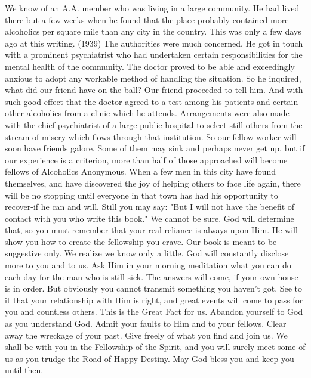 \begin{biblechapter}
We know of an A.A. member who was living in a large community.  He had lived there but a few weeks when he found that the place probably contained more alcoholics per square mile than any city in the country.  This was only a few days ago at this writing.  (1939)  The authorities were much concerned.  He got in touch with a prominent psychiatrist who had undertaken certain responsibilities for the mental health of the community.  The doctor proved to be able and exceedingly anxious to adopt any workable method of handling the situation.  So he inquired, what did our friend have on the ball?
Our friend proceeded to tell him.  And with such good effect that the doctor agreed to a test among his patients and certain other alcoholics from a clinic which he attends.  Arrangements were also made with the chief psychiatrist of a large public hospital to select still others from the stream of misery which flows through that institution.
So our fellow worker will soon have friends galore.  Some of them may sink and perhaps never get up, but if our experience is a criterion, more than half of those approached will become fellows of Alcoholics Anonymous.  When a few men in this city have found themselves, and have discovered the joy of helping others to face life again, there will be no stopping until everyone in that town has had his opportunity to recover-if he can and will.
Still you may say: "But I will not have the benefit of contact with you who write this book."  We cannot be sure.  God will determine that, so you must remember that your real reliance is always upon Him.  He will show you how to create the fellowship you crave.
Our book is meant to be suggestive only.  We realize we know only a little.  God will constantly disclose more to you and to us.  Ask Him in your morning meditation what you can do each day for the man who is still sick.  The answers will come, if your own house is in order.  But obviously you cannot transmit something you haven't got.  See to it that your relationship with Him is right, and great events will come to pass for you and countless others.  This is the Great Fact for us.
Abandon yourself to God as you understand God.  Admit your faults to Him and to your fellows.  Clear away the wreckage of your past.  Give freely of what you find and join us.  We shall be with you in the Fellowship of the Spirit, and you will surely meet some of us as you trudge the Road of Happy Destiny.
May God bless you and keep you-until then.
\end{biblechapter}
